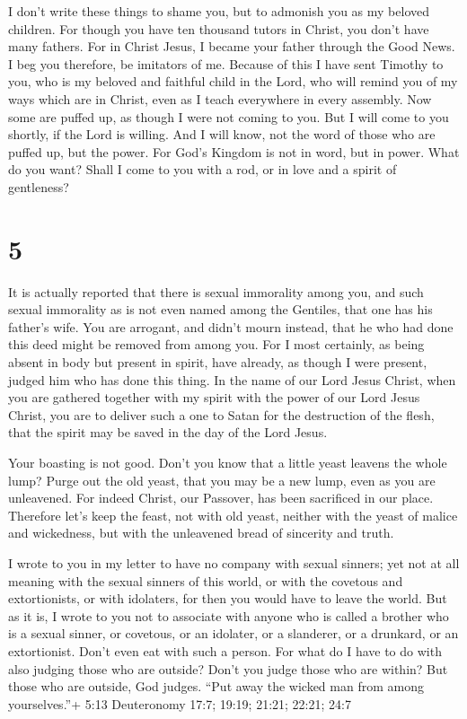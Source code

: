  I don't write these things to shame you, but to admonish
you as my beloved children.  For though you have ten
thousand tutors in Christ, you don't have many fathers. For in Christ
Jesus, I became your father through the Good News.  I beg
you therefore, be imitators of me.  Because of this I have
sent Timothy to you, who is my beloved and faithful child in the Lord,
who will remind you of my ways which are in Christ, even as I teach
everywhere in every assembly.  Now some are puffed up, as
though I were not coming to you.  But I will come to you
shortly, if the Lord is willing. And I will know, not the word of those
who are puffed up, but the power.  For God's Kingdom is not
in word, but in power.  What do you want? Shall I come to
you with a rod, or in love and a spirit of gentleness?

\hypertarget{section-4}{%
\section{5}\label{section-4}}

 It is actually reported that there is sexual immorality
among you, and such sexual immorality as is not even named among the
Gentiles, that one has his father's wife.  You are arrogant,
and didn't mourn instead, that he who had done this deed might be
removed from among you.  For I most certainly, as being
absent in body but present in spirit, have already, as though I were
present, judged him who has done this thing.  In the name of
our Lord Jesus Christ, when you are gathered together with my spirit
with the power of our Lord Jesus Christ,  you are to deliver
such a one to Satan for the destruction of the flesh, that the spirit
may be saved in the day of the Lord Jesus.

 Your boasting is not good. Don't you know that a little
yeast leavens the whole lump?  Purge out the old yeast, that
you may be a new lump, even as you are unleavened. For indeed Christ,
our Passover, has been sacrificed in our place.  Therefore
let's keep the feast, not with old yeast, neither with the yeast of
malice and wickedness, but with the unleavened bread of sincerity and
truth.

 I wrote to you in my letter to have no company with sexual
sinners;  yet not at all meaning with the sexual sinners of
this world, or with the covetous and extortionists, or with idolaters,
for then you would have to leave the world.  But as it is,
I wrote to you not to associate with anyone who is called a brother who
is a sexual sinner, or covetous, or an idolater, or a slanderer, or a
drunkard, or an extortionist. Don't even eat with such a person.
 For what do I have to do with also judging those who are
outside? Don't you judge those who are within?  But those
who are outside, God judges. ``Put away the wicked man from among
yourselves.''+ 5:13 Deuteronomy 17:7; 19:19; 21:21; 22:21; 24:7

